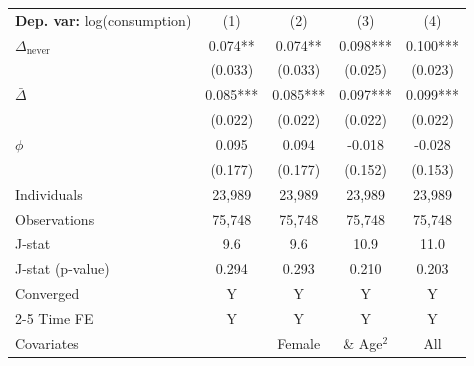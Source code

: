 \begin{tabular}{l cccc} \toprule  \textbf{Dep. var:}  log(consumption) 
                    &\multicolumn{1}{c}{(1)}   &\multicolumn{1}{c}{(2)}   &\multicolumn{1}{c}{(3)}   &\multicolumn{1}{c}{(4)}   \\

\addlinespace
$\Delta_{\text{never}}$&       0.074** &       0.074** &       0.098***&       0.100***\\
                    &     (0.033)   &     (0.033)   &     (0.025)   &     (0.023)   \\

\addlinespace
$\bar{\Delta}$      &       0.085***&       0.085***&       0.097***&       0.099***\\
                    &     (0.022)   &     (0.022)   &     (0.022)   &     (0.022)   \\

\addlinespace
$\phi$              &       0.095   &       0.094   &      -0.018   &      -0.028   \\
                    &     (0.177)   &     (0.177)   &     (0.152)   &     (0.153)   \\
\addlinespace
Individuals         &      23,989   &      23,989   &      23,989   &      23,989   \\
Observations        &      75,748   &      75,748   &      75,748   &      75,748   \\
J-stat              &         9.6   &         9.6   &        10.9   &        11.0   \\
J-stat (p-value)    &       0.294   &       0.293   &       0.210   &       0.203   \\
Converged           &           Y   &           Y   &           Y   &           Y   \\
\cmidrule{2-5} Time FE & Y & Y & Y & Y \\ Covariates & & Female & \& Age$^2$ & All \\ \bottomrule \end{tabular}
